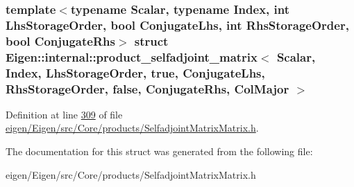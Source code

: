 \subsubsection*{template$<$typename Scalar, typename Index, int Lhs\+Storage\+Order, bool Conjugate\+Lhs, int Rhs\+Storage\+Order, bool Conjugate\+Rhs$>$\newline
struct Eigen\+::internal\+::product\+\_\+selfadjoint\+\_\+matrix$<$ Scalar, Index, Lhs\+Storage\+Order, true, Conjugate\+Lhs, Rhs\+Storage\+Order, false, Conjugate\+Rhs, Col\+Major $>$}



Definition at line \hyperlink{eigen_2_eigen_2src_2_core_2products_2_selfadjoint_matrix_matrix_8h_source_l00309}{309} of file \hyperlink{eigen_2_eigen_2src_2_core_2products_2_selfadjoint_matrix_matrix_8h_source}{eigen/\+Eigen/src/\+Core/products/\+Selfadjoint\+Matrix\+Matrix.\+h}.



The documentation for this struct was generated from the following file\+:\begin{DoxyCompactItemize}
\item 
eigen/\+Eigen/src/\+Core/products/\+Selfadjoint\+Matrix\+Matrix.\+h\end{DoxyCompactItemize}
